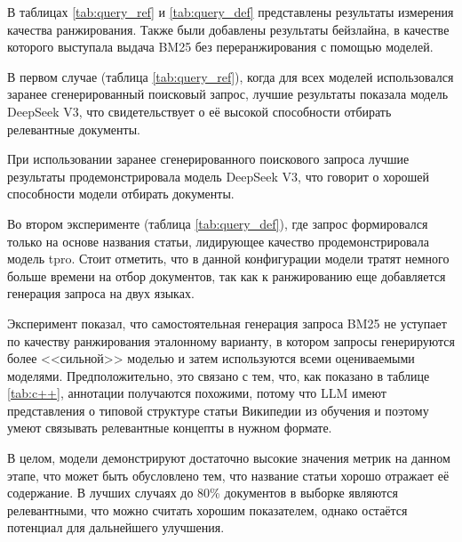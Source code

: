 \documentclass{article}
\theoremstyle{definition}
\theoremstyle{plain}
\begin{document}
В таблицах \ref{tab:query_ref} и \ref{tab:query_def} представлены результаты измерения качества ранжирования. 
Также были добавлены результаты бейзлайна, в качестве которого выступала выдача BM25 без переранжирования с помощью моделей. 

В первом случае (таблица \ref{tab:query_ref}), когда для всех моделей использовался заранее сгенерированный поисковый запрос, 
лучшие результаты показала модель DeepSeek V3, что свидетельствует о её высокой способности отбирать релевантные документы.

При использовании заранее сгенерированного поискового запроса лучшие результаты продемонстрировала модель DeepSeek V3, что говорит о хорошей способности модели отбирать документы.

Во втором эксперименте (таблица \ref{tab:query_def}), где запрос формировался только на основе названия статьи, лидирующее качество продемонстрировала модель tpro. 
Стоит отметить, что в данной конфигурации модели тратят немного больше времени на отбор документов, так как к ранжированию еще добавляется генерация запроса на двух языках.

Эксперимент показал, что самостоятельная генерация запроса BM25 не уступает по качеству ранжирования эталонному варианту, в котором запросы генерируются более <<сильной>> моделью и затем
используются всеми оцениваемыми моделями. Предположительно, это связано с тем, что, как показано в таблице \ref{tab:c++}, аннотации получаются похожими, потому что
LLM имеют представления о типовой структуре статьи Википедии из обучения и поэтому умеют связывать релевантные концепты в нужном формате.

В целом, модели демонстрируют достаточно высокие значения метрик на данном этапе, что может быть обусловлено тем, что название статьи хорошо отражает её содержание. 
В лучших случаях до 80\% документов в выборке являются релевантными, что можно считать хорошим показателем, однако остаётся потенциал для дальнейшего улучшения.
\end{document}
